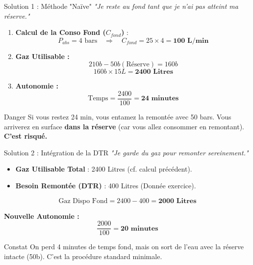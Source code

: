 \begin{frame}{Solution 1 : Méthode "Naïve"}
    \textit{"Je reste au fond tant que je n'ai pas atteint ma réserve."}
    
    \begin{enumerate}
        \item \textbf{Calcul de la Conso Fond ($C_{fond}$)} :
        $$ P_{abs} = 4 \text{ bars} \quad \Rightarrow \quad C_{fond} = 25 \times 4 = \mathbf{100 \text{ L/min}} $$
        
        \item \textbf{Gaz Utilisable :}
        $$ 210b - 50b (\text{Réserve}) = 160b $$
        $$ 160b \times 15L = \mathbf{2400 \text{ Litres}} $$
        
        \item \textbf{Autonomie :}
        $$ \text{Temps} = \frac{2400}{100} = \mathbf{24 \text{ minutes}} $$
    \end{enumerate}
    
    \begin{alertblock}{Danger}
        Si vous restez 24 min, vous entamez la remontée avec 50 bars.
        Vous arriverez en surface \textbf{dans la réserve} (car vous allez consommer en remontant). \textbf{C'est risqué.}
    \end{alertblock}
\end{frame}

\begin{frame}{Solution 2 : Intégration de la DTR}
    \textit{"Je garde du gaz pour remonter sereinement."}
    
    \begin{itemize}
        \item \textbf{Gaz Utilisable Total} : 2400 Litres (cf. calcul précédent).
        \item \textbf{Besoin Remontée (DTR)} : 400 Litres (Donnée exercice).
    \end{itemize}
    
    $$ \text{Gaz Dispo Fond} = 2400 - 400 = \mathbf{2000 \text{ Litres}} $$
    
    \textbf{Nouvelle Autonomie :}
    $$ \frac{2000}{100} = \mathbf{20 \text{ minutes}} $$
    
    \begin{block}{Constat}
        On perd 4 minutes de temps fond, mais on sort de l'eau avec la réserve intacte (50b). C'est la procédure standard minimale.
    \end{block}
\end{frame}

